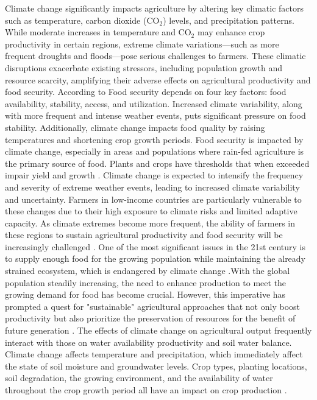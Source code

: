 Climate change significantly impacts agriculture by altering key climatic factors such as temperature, carbon dioxide (CO$_2$) levels, and precipitation patterns. While moderate increases in temperature and CO$_2$ may enhance crop productivity in certain regions, extreme climate variations—such as more frequent droughts and floods—pose serious challenges to farmers. These climatic disruptions exacerbate existing stressors, including population growth and resource scarcity, amplifying their adverse effects on agricultural productivity and food security\parencite{global_paudel_2015}. According to \textcite{kangClimateChangeImpacts2009} Food security depends on four key factors: food availability, stability, access, and utilization. Increased climate variability, along with more frequent and intense weather events, puts significant pressure on food stability. Additionally, climate change impacts food quality by raising temperatures and shortening crop growth periods. Food security is impacted by climate change, especially in areas and populations where rain-fed agriculture is the primary source of food. Plants and crops have thresholds that when exceeded impair yield and growth \parencite{mulunehImpactClimateChange2021}. Climate change is expected to intensify the frequency and severity of extreme weather events, leading to increased climate variability and uncertainty. Farmers in low-income countries are particularly vulnerable to these changes due to their high exposure to climate risks and limited adaptive capacity.  As climate extremes become more frequent, the ability of farmers in these regions to sustain agricultural productivity and food security will be increasingly challenged \parencite{budhathokiAssessingFarmersPreparedness2020}. 
One of the most significant issues in the 21st century is to supply enough food for the growing population while maintaining the already strained ecosystem, which is endangered by climate change \parencite{kangClimateChangeImpacts2009}.With the global population steadily increasing, the need to enhance production to meet the growing demand for food has become crucial. However, this imperative has prompted a quest for "sustainable" agricultural approaches that not only boost productivity but also prioritize the preservation of resources for the benefit of future generation \parencite{singhSocioeconomicStatusQualitative2022}. 
The effects of climate change on agricultural output frequently interact with those on water availability productivity and soil water balance. Climate change affects temperature and precipitation, which immediately affect the state of soil moisture and groundwater levels. Crop types, planting locations, soil degradation, the growing environment, and the availability of water throughout the crop growth period all have an impact on crop production \parencite{risalImpactClimateChange2022}.
